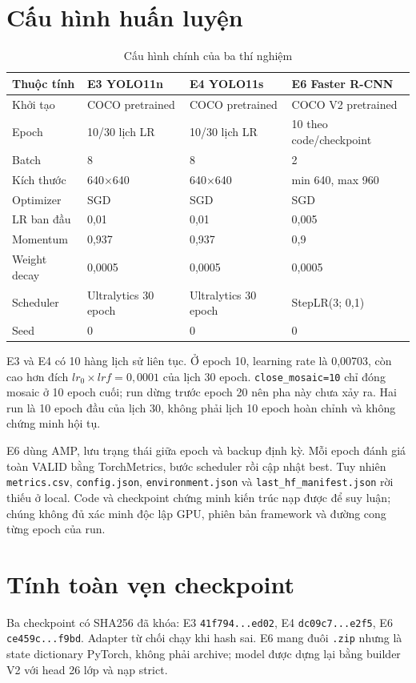 \section{Cấu hình huấn luyện}
\begin{table}[H]\centering\small
\caption{Cấu hình chính của ba thí nghiệm}\label{tab:traincfg}
\begin{tabular}{p{3.1cm}p{3.3cm}p{3.3cm}p{4.5cm}}\toprule
Thuộc tính & E3 YOLO11n & E4 YOLO11s & E6 Faster R-CNN\\\midrule
Khởi tạo & COCO pretrained & COCO pretrained & COCO V2 pretrained\\
Epoch & 10/30 lịch LR & 10/30 lịch LR & 10 theo code/checkpoint\\
Batch & 8 & 8 & 2\\
Kích thước & 640×640 & 640×640 & min 640, max 960\\
Optimizer & SGD & SGD & SGD\\
LR ban đầu & 0,01 & 0,01 & 0,005\\
Momentum & 0,937 & 0,937 & 0,9\\
Weight decay & 0,0005 & 0,0005 & 0,0005\\
Scheduler & Ultralytics 30 epoch & Ultralytics 30 epoch & StepLR(3; 0,1)\\
Seed & 0 & 0 & 0\\\bottomrule
\end{tabular}
\end{table}

E3 và E4 có 10 hàng lịch sử liên tục. Ở epoch 10, learning rate là 0,00703, còn cao hơn đích $lr_0\times lrf=0,0001$ của lịch 30 epoch. \texttt{close\_mosaic=10} chỉ đóng mosaic ở 10 epoch cuối; run dừng trước epoch 20 nên pha này chưa xảy ra. Hai run là 10 epoch đầu của lịch 30, không phải lịch 10 epoch hoàn chỉnh và không chứng minh hội tụ.

E6 dùng AMP, lưu trạng thái giữa epoch và backup định kỳ. Mỗi epoch đánh giá toàn VALID bằng TorchMetrics, bước scheduler rồi cập nhật best. Tuy nhiên \texttt{metrics.csv}, \texttt{config.json}, \texttt{environment.json} và \texttt{last\_hf\_manifest.json} rời thiếu ở local. Code và checkpoint chứng minh kiến trúc nạp được để suy luận; chúng không đủ xác minh độc lập GPU, phiên bản framework và đường cong từng epoch của run.

\section{Tính toàn vẹn checkpoint}
Ba checkpoint có SHA256 đã khóa: E3 \texttt{41f794...ed02}, E4 \texttt{dc09c7...e2f5}, E6 \texttt{ce459c...f9bd}. Adapter từ chối chạy khi hash sai. E6 mang đuôi \texttt{.zip} nhưng là state dictionary PyTorch, không phải archive; model được dựng lại bằng builder V2 với head 26 lớp và nạp strict.

